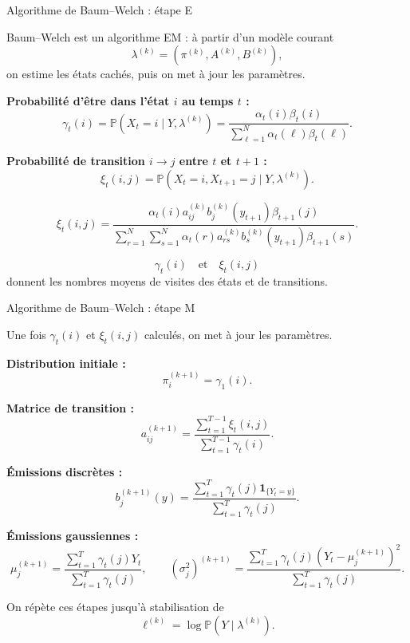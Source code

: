 \documentclass{beamer}
\begin{document}
\begin{frame}{Algorithme de Baum--Welch : étape E}

\scriptsize

Baum--Welch est un algorithme EM : à partir d'un modèle courant
\[
\lambda^{(k)}=(\pi^{(k)},A^{(k)},B^{(k)}),
\]
on estime les états cachés, puis on met à jour les paramètres.

\vspace{0.25cm}

\textbf{Probabilité d'être dans l'état \(i\) au temps \(t\) :}
\[
\gamma_t(i)
=
\mathbb{P}(X_t=i\mid Y,\lambda^{(k)})
=
\frac{\alpha_t(i)\beta_t(i)}
{\sum_{\ell=1}^{N}\alpha_t(\ell)\beta_t(\ell)}.
\]

\vspace{0.25cm}

\textbf{Probabilité de transition \(i\to j\) entre \(t\) et \(t+1\) :}
\[
\xi_t(i,j)
=
\mathbb{P}(X_t=i,X_{t+1}=j\mid Y,\lambda^{(k)}).
\]

\[
\xi_t(i,j)
=
\frac{
\alpha_t(i)a_{ij}^{(k)}b_j^{(k)}(y_{t+1})\beta_{t+1}(j)
}{
\sum_{r=1}^{N}\sum_{s=1}^{N}
\alpha_t(r)a_{rs}^{(k)}b_s^{(k)}(y_{t+1})\beta_{t+1}(s)
}.
\]

\vspace{0.2cm}

\[
\gamma_t(i)
\quad \text{et} \quad
\xi_t(i,j)
\]
donnent les nombres moyens de visites des états et de transitions.

\end{frame}

\begin{frame}{Algorithme de Baum--Welch : étape M}

\scriptsize

Une fois \(\gamma_t(i)\) et \(\xi_t(i,j)\) calculés, on met à jour les paramètres.

\vspace{0.25cm}

\textbf{Distribution initiale :}
\[
\pi_i^{(k+1)}=\gamma_1(i).
\]

\vspace{0.25cm}

\textbf{Matrice de transition :}
\[
a_{ij}^{(k+1)}
=
\frac{
\sum_{t=1}^{T-1}\xi_t(i,j)
}{
\sum_{t=1}^{T-1}\gamma_t(i)
}.
\]

\vspace{0.25cm}

\textbf{Émissions discrètes :}
\[
b_j^{(k+1)}(y)
=
\frac{
\sum_{t=1}^{T}\gamma_t(j)\mathbf{1}_{\{Y_t=y\}}
}{
\sum_{t=1}^{T}\gamma_t(j)
}.
\]

\vspace{0.25cm}

\textbf{Émissions gaussiennes :}
\[
\mu_j^{(k+1)}
=
\frac{
\sum_{t=1}^{T}\gamma_t(j)Y_t
}{
\sum_{t=1}^{T}\gamma_t(j)
},
\qquad
(\sigma_j^2)^{(k+1)}
=
\frac{
\sum_{t=1}^{T}\gamma_t(j)(Y_t-\mu_j^{(k+1)})^2
}{
\sum_{t=1}^{T}\gamma_t(j)
}.
\]

\vspace{0.2cm}

On répète ces étapes jusqu'à stabilisation de
\[
\ell^{(k)}=\log \mathbb{P}(Y\mid \lambda^{(k)}).
\]

\end{frame}
\end{document}
